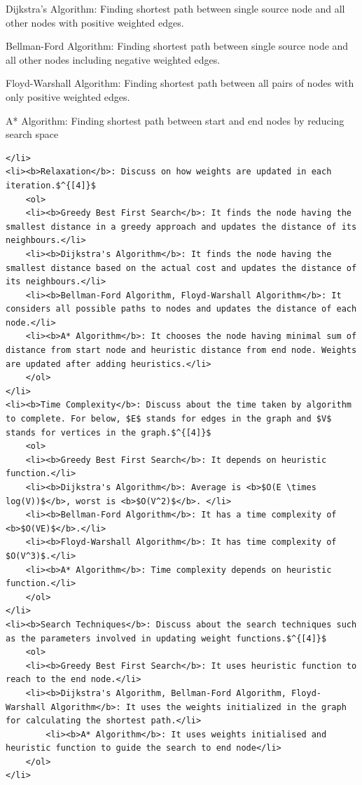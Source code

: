 \documentclass[11pt]{article}
\begin{document}
Dijkstra's Algorithm: Finding shortest path between single source node
and all other nodes with positive weighted edges.

Bellman-Ford Algorithm: Finding shortest path between single source node
and all other nodes including negative weighted edges.

Floyd-Warshall Algorithm: Finding shortest path between all pairs of
nodes with only positive weighted edges.

A* Algorithm: Finding shortest path between start and end nodes by
reducing search space

\begin{verbatim}
</li>
<li><b>Relaxation</b>: Discuss on how weights are updated in each iteration.$^{[4]}$
    <ol>
    <li><b>Greedy Best First Search</b>: It finds the node having the smallest distance in a greedy approach and updates the distance of its neighbours.</li>
    <li><b>Dijkstra's Algorithm</b>: It finds the node having the smallest distance based on the actual cost and updates the distance of its neighbours.</li>
    <li><b>Bellman-Ford Algorithm, Floyd-Warshall Algorithm</b>: It considers all possible paths to nodes and updates the distance of each node.</li>
    <li><b>A* Algorithm</b>: It chooses the node having minimal sum of distance from start node and heuristic distance from end node. Weights are updated after adding heuristics.</li>
    </ol>
</li>
<li><b>Time Complexity</b>: Discuss about the time taken by algorithm to complete. For below, $E$ stands for edges in the graph and $V$ stands for vertices in the graph.$^{[4]}$
    <ol>
    <li><b>Greedy Best First Search</b>: It depends on heuristic function.</li>
    <li><b>Dijkstra's Algorithm</b>: Average is <b>$O(E \times log(V))$</b>, worst is <b>$O(V^2)$</b>. </li>
    <li><b>Bellman-Ford Algorithm</b>: It has a time complexity of <b>$O(VE)$</b>.</li>
    <li><b>Floyd-Warshall Algorithm</b>: It has time complexity of $O(V^3)$.</li>
    <li><b>A* Algorithm</b>: Time complexity depends on heuristic function.</li>
    </ol>
</li>
<li><b>Search Techniques</b>: Discuss about the search techniques such as the parameters involved in updating weight functions.$^{[4]}$
    <ol>
    <li><b>Greedy Best First Search</b>: It uses heuristic function to reach to the end node.</li>
    <li><b>Dijkstra's Algorithm, Bellman-Ford Algorithm, Floyd-Warshall Algorithm</b>: It uses the weights initialized in the graph for calculating the shortest path.</li>
        <li><b>A* Algorithm</b>: It uses weights initialised and heuristic function to guide the search to end node</li>
    </ol>
</li>
\end{verbatim}
\end{document}

